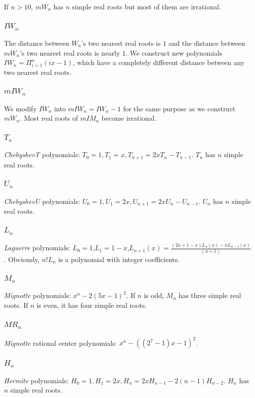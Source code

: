   If $n>10$, $mW_n$ has $n$ simple real roots but most of them are irrational.
 \subsubsection{$IW_n$}
 The distance between  $W_n$'s two  nearest real roots  is  $1$ and the distance between $mW_n$'s two nearest real roots  is nearly $1$. %
 We construct new polynomials $IW_n=\Pi_{i=1}^n(ix-1)$, which have a completely different distance between any two nearest real roots.
 \subsubsection{$ mIW_n$ }
 We modify $IW_n$  into $mIW_n=IW_n-1$ for the same purpose  as we construct $mW_n$. Most real roots of $mIM_n$  become irrational.
 \subsubsection{$T_n$} {\it ChebyshevT} polynomials: $T_0=1,T_1=x,T_{n+1}=2xT_n-T_{n-1}$. $T_n$ has $n$ simple real roots.
 \subsubsection{$U_n$} {\it ChebyshevU} polynomials: $U_0=1,U_1=2x,U_{n+1}=2xU_n-U_{n-1}$. $U_n$ has $n$ simple real roots.
 \subsubsection{$L_n$}
 {\it Laguerre}  polynomials: $L_0=1$,$L_1=1-x$,$L_{n+1}(x)=\frac{  (2n+1-x )L_n(x)-  nL_{n-1 }(x)}{(n+1) }$. %
Obviously, $n!L_n$ is a polynomial with integer coefficients.
 \subsubsection{$M_n$} {\it Mignotte} polynomials: $x^n-2(5x-1)^2$. If $n$ is odd, $M_n$ has three simple real roots. If $n$ is even, it has four simple real roots.

\subsubsection{$MR_n$}{\it Mignotte} rational center polynomials: $ x^n-((2^7-1)x-1)^2$.
	 
 \subsubsection{$H_n$}{\it Hermite } polynomials:  $H_0=1,H_1=2x,H_n=2xH_{n-1}-2(n-1)H_{n-2}$. $H_n$ has $n$ simple real roots.
 
